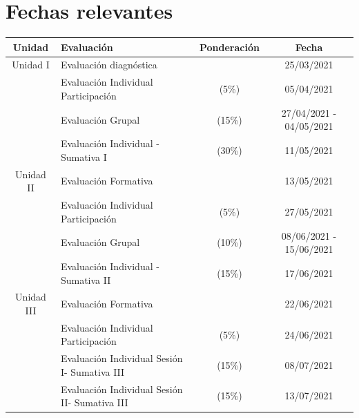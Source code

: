 \documentclass[12 pt,letterpaper]{article}
\begin{document}
\section{Fechas relevantes}

\begin{center}
\begin{tabular}{|c|l|c|c|}
	\hline
	Unidad & Evaluación & Ponderación & Fecha \\
	\hline
	Unidad I & Evaluación diagnóstica & & 25/03/2021 \\
	\hline
	& Evaluación Individual Participación & (5\%) & 05/04/2021 \\
	\hline
	& Evaluación Grupal & (15\%) & 27/04/2021 - 04/05/2021 \\
	\hline
	& Evaluación Individual - Sumativa I & (30\%) & 11/05/2021 \\
	\hline
	Unidad II & Evaluación Formativa & & 13/05/2021 \\
	\hline
	& Evaluación Individual Participación & (5\%) & 27/05/2021 \\
	\hline
	& Evaluación Grupal & (10\%) & 08/06/2021 - 15/06/2021 \\
	\hline
	& Evaluación Individual - Sumativa II & (15\%) & 17/06/2021 \\
	\hline
	Unidad III & Evaluación Formativa & & 22/06/2021 \\
	\hline
	& Evaluación Individual Participación & (5\%) & 24/06/2021 \\
	\hline
	& Evaluación Individual Sesión I- Sumativa III & (15\%) & 08/07/2021 \\
	\hline
	& Evaluación Individual Sesión II- Sumativa III & (15\%) & 13/07/2021 \\
	\hline
\end{tabular}
\end{center}
\end{document}
